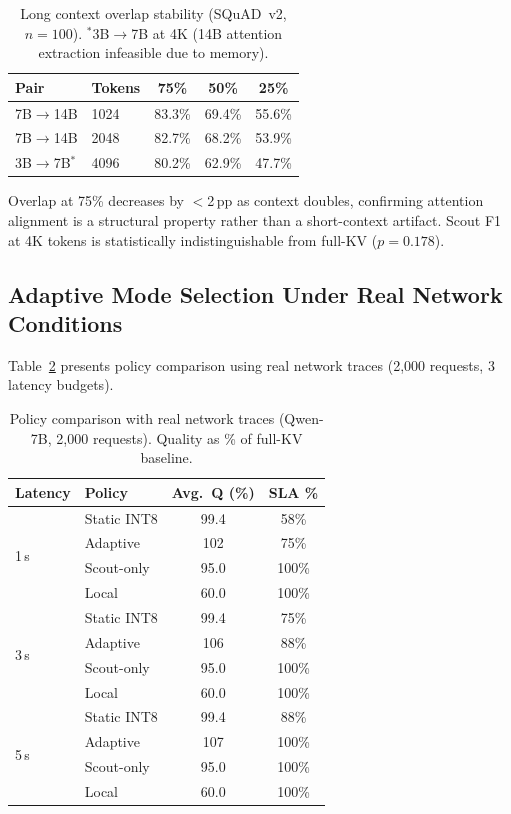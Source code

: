 \documentclass{article}
\begin{document}
\begin{table}[t]
\centering
\caption{Long context overlap stability (SQuAD~v2, $n = 100$). $^*$3B$\to$7B at 4K (14B attention extraction infeasible due to memory).}
\label{tab:long_ctx}
\small
\begin{tabular}{@{}llccc@{}}
\toprule
\textbf{Pair} & \textbf{Tokens} & \textbf{75\%} & \textbf{50\%} & \textbf{25\%} \\
\midrule
7B$\to$14B & 1024 & 83.3\% & 69.4\% & 55.6\% \\
7B$\to$14B & 2048 & 82.7\% & 68.2\% & 53.9\% \\
3B$\to$7B$^*$ & 4096 & 80.2\% & 62.9\% & 47.7\% \\
\bottomrule
\end{tabular}
\end{table}

Overlap at 75\% decreases by $<$2\,pp as context doubles, confirming attention alignment is a structural property rather than a short-context artifact.
Scout F1 at 4K tokens is statistically indistinguishable from full-KV ($p = 0.178$).

\subsection{Adaptive Mode Selection Under Real Network Conditions}

Table~\ref{tab:protocol_sim} presents policy comparison using real network traces (2{,}000 requests, 3 latency budgets).

\begin{table}[t]
\centering
\caption{Policy comparison with real network traces (Qwen-7B, 2{,}000 requests). Quality as \% of full-KV baseline.}
\label{tab:protocol_sim}
\small
\begin{tabular}{@{}llcc@{}}
\toprule
\textbf{Latency} & \textbf{Policy} & \textbf{Avg.\ Q (\%)} & \textbf{SLA \%} \\
\midrule
\multirow{4}{*}{1\,s}
  & Static INT8    & 99.4 & 58\% \\
  & Adaptive       & 102  & 75\% \\
  & Scout-only     & 95.0 & 100\% \\
  & Local          & 60.0 & 100\% \\
\midrule
\multirow{4}{*}{3\,s}
  & Static INT8    & 99.4 & 75\% \\
  & Adaptive       & 106  & 88\% \\
  & Scout-only     & 95.0 & 100\% \\
  & Local          & 60.0 & 100\% \\
\midrule
\multirow{4}{*}{5\,s}
  & Static INT8    & 99.4 & 88\% \\
  & Adaptive       & 107  & 100\% \\
  & Scout-only     & 95.0 & 100\% \\
  & Local          & 60.0 & 100\% \\
\bottomrule
\end{tabular}
\end{table}
\end{document}
